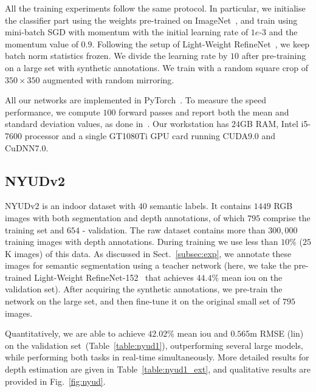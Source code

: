 \documentclass[letterpaper, 10 pt, conference]{ieeeconf}
\begin{document}
All the training experiments follow the same protocol. In particular, we initialise the classifier part using the weights pre-trained on ImageNet~\cite{DengDSLL009}, and train using mini-batch SGD with momentum with the initial learning rate of $1e$-$3$ and the momentum value of $0.9$. Following the setup of Light-Weight RefineNet~\cite{nekrasovlight}, we keep batch norm statistics frozen. We divide the learning rate by $10$ after pre-training on a large set with synthetic annotations. We train with a random square crop of $350\times350$ augmented with random mirroring.

All our networks are implemented in PyTorch~\cite{paszke2017automatic}. To measure the speed performance, we compute $100$ forward passes and report both the mean and standard deviation values, as done in~\cite{nekrasovlight}. Our workstation has $24$GB RAM, Intel i5-7600 processor and a single GT1080Ti GPU card running CUDA9.0 and CuDNN7.0.

\subsection{NYUDv2}
\label{exp-nyudv2}

NYUDv2 is an indoor dataset with $40$ semantic labels. It contains $1449$ RGB images with both segmentation and depth annotations, of which $795$ comprise the training set and $654$ - validation. The raw dataset contains more than $300,000$ training images with depth annotations. During training we use less than $10\%$ ($25$K images) of this data. As discussed in Sect.~\ref{subsec:exp}, we annotate these images for semantic segmentation using a teacher network (here, we take the pre-trained Light-Weight RefineNet-152~\cite{nekrasovlight} that achieves $44.4\%$ mean iou on the validation set). After acquiring the synthetic annotations, we pre-train the network on the large set, and then fine-tune it on the original small set of $795$ images.

Quantitatively, we are able to achieve $42.02\%$ mean iou and $0.565$m RMSE (lin) on the validation set~(Table~\ref{table:nyud1}), outperforming several large models, while performing both tasks in real-time simultaneously. More detailed results for depth estimation are given in Table~\ref{table:nyud1_ext}, and qualitative results are provided in Fig.~\ref{fig:nyud}.
\end{document}
